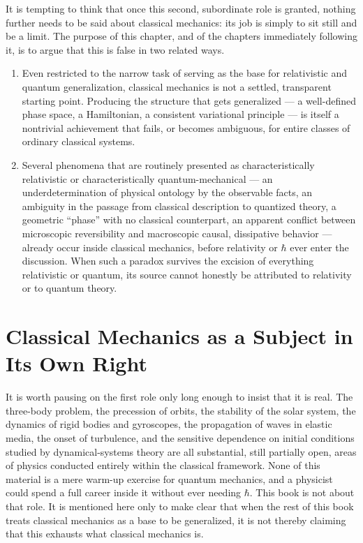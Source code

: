 It is tempting to think that once this second, subordinate role is granted, nothing
further needs to be said about classical mechanics: its job is simply to sit still
and be a limit. The purpose of this chapter, and of the chapters immediately
following it, is to argue that this is false in two related ways.

\begin{enumerate}
  \item Even restricted to the narrow task of serving as the base for
  relativistic and quantum generalization, classical mechanics is not a settled,
  transparent starting point. Producing the structure that gets generalized ---
  a well-defined phase space, a Hamiltonian, a consistent variational principle
  --- is itself a nontrivial achievement that fails, or becomes ambiguous, for
  entire classes of ordinary classical systems.
  \item Several phenomena that are routinely presented as characteristically
  relativistic or characteristically quantum-mechanical --- an underdetermination
  of physical ontology by the observable facts, an ambiguity in the passage from
  classical description to quantized theory, a geometric ``phase'' with no
  classical counterpart, an apparent conflict between microscopic reversibility
  and macroscopic causal, dissipative behavior --- already occur inside classical
  mechanics, before relativity or $\hbar$ ever enter the discussion. When such a
  paradox survives the excision of everything relativistic or quantum, its source
  cannot honestly be attributed to relativity or to quantum theory.
\end{enumerate}

\section{Classical Mechanics as a Subject in Its Own Right}
\label{cm:st}

It is worth pausing on the first role only long enough to insist that it is real.
The three-body problem, the precession of orbits, the stability of the solar
system, the dynamics of rigid bodies and gyroscopes, the propagation of waves in
elastic media, the onset of turbulence, and the sensitive dependence on initial
conditions studied by dynamical-systems theory are all substantial, still
partially open, areas of physics conducted entirely within the classical
framework. None of this material is a mere warm-up exercise for quantum mechanics,
and a physicist could spend a full career inside it without ever needing $\hbar$.
This book is not about that role. It is mentioned here only to make clear that
when the rest of this book treats classical mechanics as a base to be generalized,
it is not thereby claiming that this exhausts what classical mechanics is.

